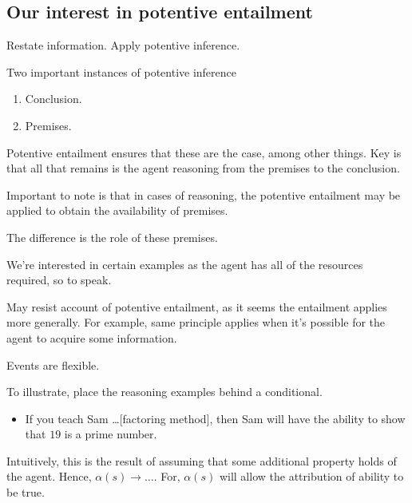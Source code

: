 \subsection{Our interest in potentive entailment}
\label{sec:our-inter-potent}

\begin{note}
  Restate information.
  Apply potentive inference.

  Two important instances of potentive inference
  \begin{enumerate}
  \item Conclusion.
  \item Premises.
  \end{enumerate}
  Potentive entailment ensures that these are the case, among other things.
  Key is that all that remains is the agent reasoning from the premises to the conclusion.
\end{note}

\begin{note}
  Important to note is that in cases of reasoning, the potentive entailment may be applied to obtain the availability of premises.

  The difference is the role of these premises.
\end{note}

\begin{note}
  We're interested in certain examples as the agent has all of the resources required, so to speak.

  May resist account of potentive entailment, as it seems the entailment applies more generally.
  For example, same principle applies when it's possible for the agent to acquire some information.

  Events are flexible.
  

  To illustrate, place the reasoning examples behind a conditional.
  \begin{itemize}
  \item If you teach Sam \dots [factoring method], then Sam will have the ability to show that \(19\) is a prime number.
  \end{itemize}
  Intuitively, this is the result of assuming that some additional property holds of the agent.
  Hence, \(\alpha(s) \rightarrow \dots\).
  For, \(\alpha(s)\) will allow the attribution of ability to be true.
\end{note}

